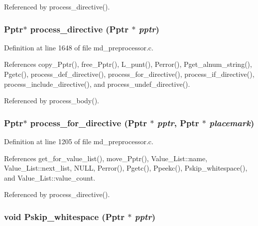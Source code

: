 Referenced by process\_\-directive().
\subsubsection{\setlength{\rightskip}{0pt plus 5cm}\bf{Pptr}$\ast$ process\_\-directive (\bf{Pptr} $\ast$ {\em pptr})}\label{md__preprocessor_8h_9fedc647fa9d620c00f1cf9cd84f2da4}




Definition at line 1648 of file md\_\-preprocessor.c.

References copy\_\-Pptr(), free\_\-Pptr(), L\_\-punt(), Perror(), Pget\_\-alnum\_\-string(), Pgetc(), process\_\-def\_\-directive(), process\_\-for\_\-directive(), process\_\-if\_\-directive(), process\_\-include\_\-directive(), and process\_\-undef\_\-directive().

Referenced by process\_\-body().
\subsubsection{\setlength{\rightskip}{0pt plus 5cm}\bf{Pptr}$\ast$ process\_\-for\_\-directive (\bf{Pptr} $\ast$ {\em pptr}, \bf{Pptr} $\ast$ {\em placemark})}\label{md__preprocessor_8h_79a2bf4e345e50554d0015b3fcdb30e3}




Definition at line 1205 of file md\_\-preprocessor.c.

References get\_\-for\_\-value\_\-list(), move\_\-Pptr(), Value\_\-List::name, Value\_\-List::next\_\-list, NULL, Perror(), Pgetc(), Ppeekc(), Pskip\_\-whitespace(), and Value\_\-List::value\_\-count.

Referenced by process\_\-directive().
\subsubsection{\setlength{\rightskip}{0pt plus 5cm}void Pskip\_\-whitespace (\bf{Pptr} $\ast$ {\em pptr})}\label{md__preprocessor_8h_c1fa9396790747922ef69a79f8c21e8c}




